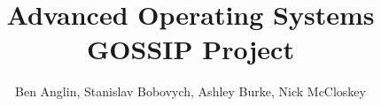 \documentclass[a4paper,12pt]{article}
\begin{document}
\title{Advanced Operating Systems GOSSIP Project}
\author{Ben Anglin, Stanislav Bobovych, Ashley Burke, Nick McCloskey}
\maketitle

\graphicspath{{./images/}}

%

%



%
%

%
%
\end{document}
